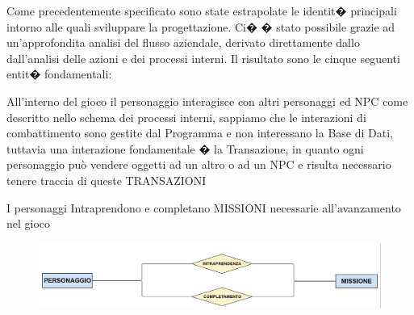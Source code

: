 Come precedentemente specificato sono state estrapolate le identit� principali intorno alle quali sviluppare la progettazione. Ci� � stato possibile grazie ad un'approfondita analisi del flusso aziendale, derivato direttamente dallo dall'analisi delle azioni e dei processi interni.\newline
Il risultato sono le cinque seguenti entit� fondamentali: \newline

\noindent{}






All'interno del gioco il personaggio interagisce con altri personaggi ed NPC come descritto nello schema dei processi interni,
sappiamo che le interazioni di combattimento sono gestite dal Programma e non interessano la Base di Dati, tuttavia una interazione fondamentale �
la Transazione, in quanto ogni personaggio pu\`{o} vendere oggetti ad un altro o ad un NPC e risulta necessario tenere traccia di queste TRANSAZIONI

I personaggi Intraprendono e completano MISSIONI necessarie all'avanzamento nel gioco

\begin{figure}[H]
\centering
\includegraphics[width=0.7\linewidth]{./immagini/persomiss.png}
\end{figure}


